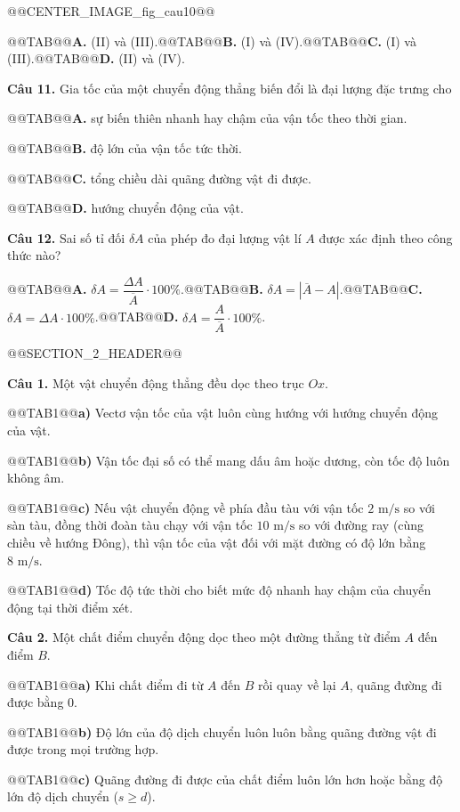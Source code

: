 \documentclass{article}
\begin{document}
@@CENTER_IMAGE_fig_cau10@@

@@TAB@@\textbf{A.} (II) và (III).@@TAB@@\textbf{B.} (I) và (IV).@@TAB@@\textbf{C.} (I) và (III).@@TAB@@\textbf{D.} (II) và (IV).

\textbf{Câu 11.} Gia tốc của một chuyển động thẳng biến đổi là đại lượng đặc trưng cho

@@TAB@@\textbf{A.} sự biến thiên nhanh hay chậm của vận tốc theo thời gian.

@@TAB@@\textbf{B.} độ lớn của vận tốc tức thời.

@@TAB@@\textbf{C.} tổng chiều dài quãng đường vật đi được.

@@TAB@@\textbf{D.} hướng chuyển động của vật.

\textbf{Câu 12.} Sai số tỉ đối $\delta A$ của phép đo đại lượng vật lí $A$ được xác định theo công thức nào?

@@TAB@@\textbf{A.} $\delta A = \dfrac{\Delta A}{\overline{A}} \cdot 100\%$.@@TAB@@\textbf{B.} $\delta A = |\overline{A} - A|$.@@TAB@@\textbf{C.} $\delta A = \Delta A \cdot 100\%$.@@TAB@@\textbf{D.} $\delta A = \dfrac{A}{\overline{A}} \cdot 100\%$.

@@SECTION_2_HEADER@@

\textbf{Câu 1.} Một vật chuyển động thẳng đều dọc theo trục $Ox$.

@@TAB1@@\textbf{a)} Vectơ vận tốc của vật luôn cùng hướng với hướng chuyển động của vật.

@@TAB1@@\textbf{b)} Vận tốc đại số có thể mang dấu âm hoặc dương, còn tốc độ luôn không âm.

@@TAB1@@\textbf{c)} Nếu vật chuyển động về phía đầu tàu với vận tốc $2\text{ m/s}$ so với sàn tàu, đồng thời đoàn tàu chạy với vận tốc $10\text{ m/s}$ so với đường ray (cùng chiều về hướng Đông), thì vận tốc của vật đối với mặt đường có độ lớn bằng $8\text{ m/s}$.

@@TAB1@@\textbf{d)} Tốc độ tức thời cho biết mức độ nhanh hay chậm của chuyển động tại thời điểm xét.

\textbf{Câu 2.} Một chất điểm chuyển động dọc theo một đường thẳng từ điểm $A$ đến điểm $B$.

@@TAB1@@\textbf{a)} Khi chất điểm đi từ $A$ đến $B$ rồi quay về lại $A$, quãng đường đi được bằng $0$.

@@TAB1@@\textbf{b)} Độ lớn của độ dịch chuyển luôn luôn bằng quãng đường vật đi được trong mọi trường hợp.

@@TAB1@@\textbf{c)} Quãng đường đi được của chất điểm luôn lớn hơn hoặc bằng độ lớn độ dịch chuyển ($s \ge d$).
\end{document}
